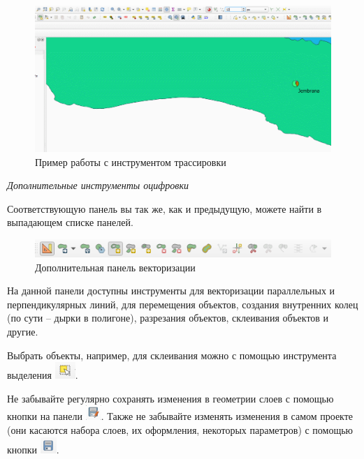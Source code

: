 \documentclass[
  12pt,
]{book}
\begin{document}
\begin{figure}
\centering
\includegraphics{images/vector/Tracing.gif}
\caption{Пример работы с инструментом трассировки}
\end{figure}

\emph{Дополнительные инструменты оцифровки}

Соответствующую панель вы так же, как и предыдущую, можете найти в выпадающем списке панелей.

\begin{figure}
\centering
\includegraphics{images/vector/Additional_panel.png}
\caption{Дополнительная панель векторизации}
\end{figure}

На данной панели доступны инструменты для векторизации параллельных и перпендикулярных линий, для перемещения объектов, создания внутренних колец (по сути -- дырки в полигоне), разрезания объектов, склеивания объектов и другие.

Выбрать объекты, например, для склеивания можно с помощью инструмента выделения \includegraphics{images/vector/Selection_tool.png}.

Не забывайте регулярно сохранять изменения в геометрии слоев с помощью кнопки на панели \includegraphics{images/vector/Save_edits.png}. Также не забывайте изменять изменения в самом проекте (они касаются набора слоев, их оформления, некоторых параметров) с помощью кнопки \includegraphics{images/vector/Save_project.png}.
\end{document}

